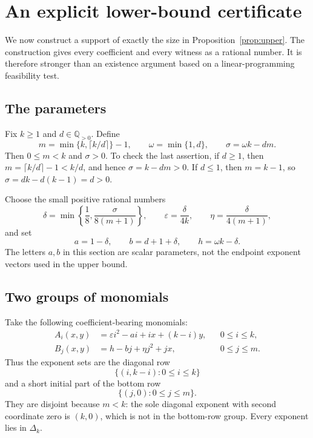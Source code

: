 \documentclass[11pt,a4paper]{article}
\numberwithin{equation}{section}
\theoremstyle{definition}
\theoremstyle{remark}
\newcommand{\Q}{\mathbb Q}
\begin{document}
\section{An explicit lower-bound certificate}
\label{sec:lower}

We now construct a support of exactly the size in Proposition~\ref{prop:upper}.
The construction gives every coefficient and every witness as a rational
number. It is therefore stronger than an existence argument based on a
linear-programming feasibility test.

\subsection{The parameters}

Fix $k\geq1$ and $d\in\Q_{>0}$. Define
\begin{equation}
\label{eq:mwsigma}
m=\min\{k,\lceil k/d\rceil\}-1,\qquad
\omega=\min\{1,d\},\qquad
\sigma=\omega k-dm.
\end{equation}
Then $0\leq m<k$ and $\sigma>0$. To check the last assertion, if $d\geq1$,
then $m=\lceil k/d\rceil-1<k/d$, and hence $\sigma=k-dm>0$. If $d\leq1$,
then $m=k-1$, so $\sigma=dk-d(k-1)=d>0$.

Choose the small positive rational numbers
\begin{equation}
\label{eq:small}
\delta=\min\left\{\frac18,\frac{\sigma}{8(m+1)}\right\},\qquad
\varepsilon=\frac{\delta}{4k},\qquad
\eta=\frac{\delta}{4(m+1)},
\end{equation}
and set
\begin{equation}
\label{eq:abh}
a=1-\delta,\qquad b=d+1+\delta,\qquad h=\omega k-\delta.
\end{equation}
The letters $a,b$ in this section are scalar parameters, not the endpoint
exponent vectors used in the upper bound.

\subsection{Two groups of monomials}

Take the following coefficient-bearing monomials:
\begin{align}
A_i(x,y)&=\varepsilon i^2-ai+ix+(k-i)y,
&&0\leq i\leq k,\label{eq:Ai}\\
B_j(x,y)&=h-bj+\eta j^2+jx,
&&0\leq j\leq m.\label{eq:Bj}
\end{align}
Thus the exponent sets are the diagonal row
\[
\{(i,k-i):0\leq i\leq k\}
\]
and a short initial part of the bottom row
\[
\{(j,0):0\leq j\leq m\}.
\]
They are disjoint because $m<k$: the sole diagonal exponent with second
coordinate zero is $(k,0)$, which is not in the bottom-row group.
Every exponent lies in $\Delta_k$.
\end{document}
